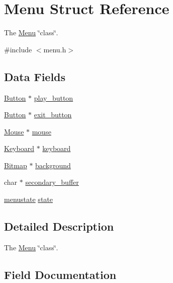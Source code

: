 \hypertarget{struct_menu}{}\section{Menu Struct Reference}
\label{struct_menu}


The \hyperlink{struct_menu}{Menu} \char`\"{}class\char`\"{}.  




{\ttfamily \#include $<$menu.\+h$>$}

\subsection*{Data Fields}
\begin{DoxyCompactItemize}
\item 
\hyperlink{struct_button}{Button} $\ast$ \hyperlink{struct_menu_a17eeafa4c78aca8816c6aee85ce3a836}{play\+\_\+button}
\item 
\hyperlink{struct_button}{Button} $\ast$ \hyperlink{struct_menu_a173a61ec5be315a84389cc08d3852abe}{exit\+\_\+button}
\item 
\hyperlink{struct_mouse}{Mouse} $\ast$ \hyperlink{struct_menu_a2514b83cbae6998a57eae74a24f6faf4}{mouse}
\item 
\hyperlink{struct_keyboard}{Keyboard} $\ast$ \hyperlink{struct_menu_a945ceeb6236fbaf00dcdb7a0109f0d40}{keyboard}
\item 
\hyperlink{struct_bitmap}{Bitmap} $\ast$ \hyperlink{struct_menu_a15de70574bc710486bf129a5c8f1634e}{background}
\item 
char $\ast$ \hyperlink{struct_menu_a1820f1e9a26c0253b13be1df94052ca1}{secondary\+\_\+buffer}
\item 
\hyperlink{group__menu_ga187fcd377cc0b403aaec48d4cfdc559a}{menustate} \hyperlink{struct_menu_aa42946365311ec5aa5a3ab71b9c52968}{state}
\end{DoxyCompactItemize}


\subsection{Detailed Description}
The \hyperlink{struct_menu}{Menu} \char`\"{}class\char`\"{}. 

\subsection{Field Documentation}
\hypertarget{struct_menu_a15de70574bc710486bf129a5c8f1634e}{}\label{struct_menu_a15de70574bc710486bf129a5c8f1634e} 
